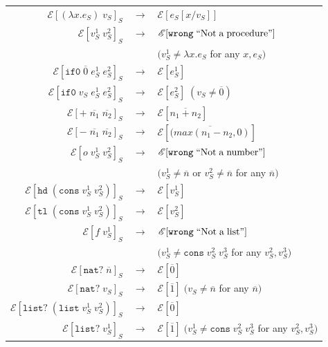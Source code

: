 \begin{figure}
\onehalfspacing
\begin{center}
\begin{tabular}{rcl}
$\mathscr{E}[(\lambda x.e_{S})\;v_{S}]_{S}$ & $\rightarrow$ & $\mathscr{E}[e_{S}[x/v_{S}]]$ \\
$\mathscr{E}[v_{S}^{1}\;v_{S}^{2}]_{S}$ & $\rightarrow$ & $\mathscr{E}[\mathtt{wrong}\;\mathrm{``Not\;a\;procedure"}]$ \\
&& $(v_{S}^{1}\neq\lambda x.e_{S}$ for any $x,e_{S})$ \\
$\mathscr{E}[\mathtt{if0}\;\overline{0}\;e_{S}^{1}\;e_{S}^{2}]_{S}$ & $\rightarrow$ & $\mathscr{E}[e_{S}^{1}]$ \\
$\mathscr{E}[\mathtt{if0}\;v_{S}\;e_{S}^{1}\;e_{S}^{2}]_{S}$ & $\rightarrow$ & $\mathscr{E}[e_{S}^{2}]\;(v_{S}\neq\overline{0})$ \\
$\mathscr{E}[+\;\overline{n_{1}}\;\overline{n_{2}}]_{S}$ & $\rightarrow$ & $\mathscr{E}[\overline{n_{1}+n_{2}}]$ \\
$\mathscr{E}[-\;\overline{n_{1}}\;\overline{n_{2}}]_{S}$ & $\rightarrow$ & $\mathscr{E}[\overline{(max(n_{1}-n_{2},0)}]$ \\
$\mathscr{E}[o\;v_{S}^{1}\;v_{S}^{2}]_{S}$ & $\rightarrow$ & $\mathscr{E}[\mathtt{wrong}\;\mathrm{``Not\;a\;number"}]$ \\
&& $(v_{S}^{1}\neq\overline{n}$ or $v_{S}^{2}\neq\overline{n}$ for any $\overline{n})$ \\
$\mathscr{E}[\mathtt{hd}\;(\mathtt{cons}\;v_{S}^{1}\;v_{S}^{2})]_{S}$ & $\rightarrow$ & $\mathscr{E}[v_{S}^{1}]$ \\
$\mathscr{E}[\mathtt{tl}\;(\mathtt{cons}\;v_{S}^{1}\;v_{S}^{2})]_{S}$ & $\rightarrow$ & $\mathscr{E}[v_{S}^{2}]$ \\
$\mathscr{E}[f\;v_{S}^{1}]_{S}$ & $\rightarrow$ & $\mathscr{E}[\mathtt{wrong}\;\mathrm{``Not\;a\;list"}]$ \\
&& $(v_{S}^{1}\neq\mathtt{cons}\;v_{S}^{2}\;v_{S}^{3}$ for any $v_{S}^{2},v_{S}^{3})$ \\
$\mathscr{E}[\mathtt{nat?}\;\overline{n}]_{S}$ & $\rightarrow$ & $\mathscr{E}[\overline{0}]$ \\
$\mathscr{E}[\mathtt{nat?}\;v_{S}]_{S}$ & $\rightarrow$ & $\mathscr{E}[\overline{1}]\;(v_{S}\neq\overline{n}$ for any $\overline{n})$ \\
$\mathscr{E}[\mathtt{list?}\;(\mathtt{list}\;v_{S}^{1}\;v_{S}^{2})]_{S}$ & $\rightarrow$ & $\mathscr{E}[\overline{0}]$ \\
$\mathscr{E}[\mathtt{list?}\;v_{S}^{1}]_{S}$ & $\rightarrow$ & $\mathscr{E}[\overline{1}]\;(v_{S}^{1}\neq\mathtt{cons}\;v_{S}^{2}\;v_{S}^{3}$ for any $v_{S}^{2},v_{S}^{3})$ \\

\end{tabular}
\end{center}
\end{figure}
